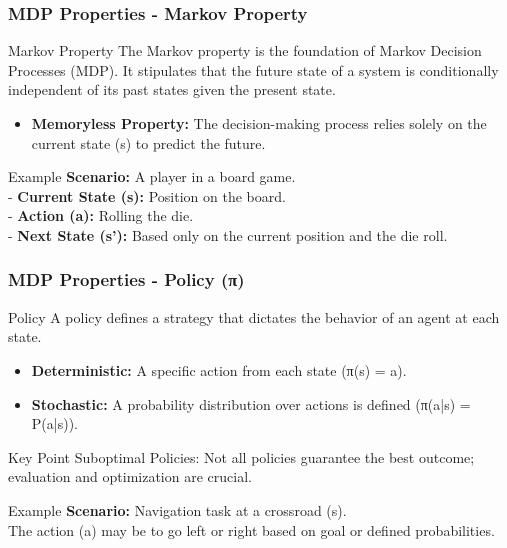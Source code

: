 \documentclass[aspectratio=169]{beamer}
\begin{document}
\begin{frame}[fragile]
    \frametitle{MDP Properties - Markov Property}
    \begin{block}{Markov Property}
        The Markov property is the foundation of Markov Decision Processes (MDP). It stipulates that the future state of a system is conditionally independent of its past states given the present state. 
    \end{block}
    \begin{itemize}
        \item \textbf{Memoryless Property:} The decision-making process relies solely on the current state (s) to predict the future.
    \end{itemize}
    \begin{block}{Example}
        \textbf{Scenario:} A player in a board game.\\
        - \textbf{Current State (s):} Position on the board.\\
        - \textbf{Action (a):} Rolling the die.\\
        - \textbf{Next State (s'):} Based only on the current position and the die roll.
    \end{block}
\end{frame}

\begin{frame}[fragile]
    \frametitle{MDP Properties - Policy (π)}
    \begin{block}{Policy}
        A policy defines a strategy that dictates the behavior of an agent at each state. 
    \end{block}
    \begin{itemize}
        \item \textbf{Deterministic:} A specific action from each state (π(s) = a).
        \item \textbf{Stochastic:} A probability distribution over actions is defined (π(a|s) = P(a|s)).
    \end{itemize}
    \begin{block}{Key Point}
        Suboptimal Policies: Not all policies guarantee the best outcome; evaluation and optimization are crucial.
    \end{block}
    \begin{block}{Example}
        \textbf{Scenario:} Navigation task at a crossroad (s).\\
        The action (a) may be to go left or right based on goal or defined probabilities.
    \end{block}
\end{frame}
\end{document}
